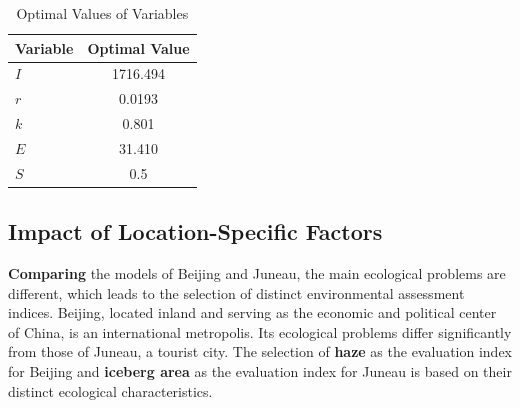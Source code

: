\documentclass[UTF8]{mcmthesis}
\begin{document}
\begin{enumerate}
                    \begin{table}[htbp]
                        \centering
                        \caption{Optimal Values of Variables}
                        \begin{tabular}{l c}
                            \toprule
                            \textbf{Variable} & \textbf{Optimal Value} \\
                            \midrule
                            \( I \) & 1716.494 \\
                            \( r \) & 0.0193 \\
                            \( k \) & 0.801 \\
                            \( E \) & 31.410 \\
                            \( S \) & 0.5 \\
                            \bottomrule
                        \end{tabular}
                        \label{tab:optimal_values}
                    \end{table}
                \end{enumerate}
                \subsection{Impact of Location-Specific Factors}

                \hspace*{2em} \textbf{Comparing} the models of Beijing and Juneau, the main ecological problems are different, which leads to the selection of distinct environmental assessment indices. Beijing, located inland and serving as the economic and political center of China, is an international metropolis. Its ecological problems differ significantly from those of Juneau, a tourist city. The selection of \textbf{haze} as the evaluation index for Beijing and \textbf{iceberg area} as the evaluation index for Juneau is based on their distinct ecological characteristics.
                
\end{document}
